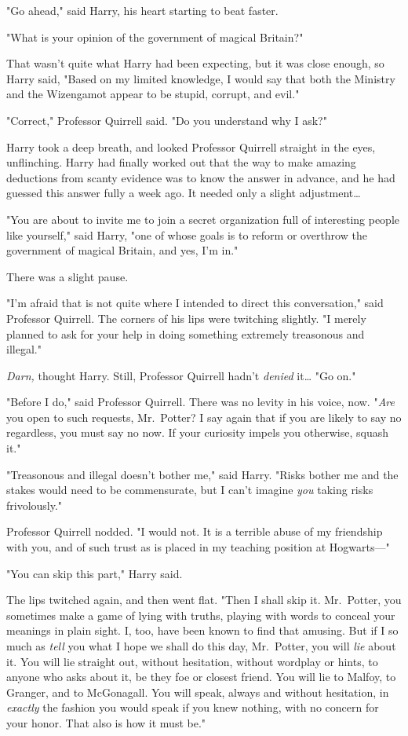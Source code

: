 "Go ahead," said Harry, his heart starting to beat faster.

"What is your opinion of the government of magical Britain?"

That wasn't quite what Harry had been expecting, but it was close enough, so 
Harry said, "Based on my limited knowledge, I would say that both the Ministry 
and the Wizengamot appear to be stupid, corrupt, and evil."

"Correct," Professor Quirrell said. "Do you understand why I ask?"

Harry took a deep breath, and looked Professor Quirrell straight in the eyes, 
unflinching. Harry had finally worked out that the way to make amazing 
deductions from scanty evidence was to know the answer in advance, and he had 
guessed this answer fully a week ago. It needed only a slight adjustment{\ldots}

"You are about to invite me to join a secret organization full of interesting 
people like yourself," said Harry, "one of whose goals is to reform or 
overthrow the government of magical Britain, and yes, I'm in."

There was a slight pause.

"I'm afraid that is not quite where I intended to direct this conversation," 
said Professor Quirrell. The corners of his lips were twitching slightly. "I 
merely planned to ask for your help in doing something extremely treasonous and 
illegal."

\emph{Darn,} thought Harry. Still, Professor Quirrell hadn't \emph{denied} 
it{\ldots} "Go on."

"Before I do," said Professor Quirrell. There was no levity in his voice, now. 
"\emph{Are} you open to such requests, Mr.~Potter? I say again that if you are 
likely to say no regardless, you must say no now. If your curiosity impels you 
otherwise, squash it."

"Treasonous and illegal doesn't bother me," said Harry. "Risks bother me and 
the stakes would need to be commensurate, but I can't imagine \emph{you} taking 
risks frivolously."

Professor Quirrell nodded. "I would not. It is a terrible abuse of my 
friendship with you, and of such trust as is placed in my teaching position at 
Hogwarts---"

"You can skip this part," Harry said.

The lips twitched again, and then went flat. "Then I shall skip it. Mr.~Potter, 
you sometimes make a game of lying with truths, playing with words to conceal 
your meanings in plain sight. I, too, have been known to find that amusing. But 
if I so much as \emph{tell} you what I hope we shall do this day, Mr.~Potter, 
you will \emph{lie} about it. You will lie straight out, without hesitation, 
without wordplay or hints, to anyone who asks about it, be they foe or closest 
friend. You will lie to Malfoy, to Granger, and to McGonagall. You will speak, 
always and without hesitation, in \emph{exactly} the fashion you would speak if 
you knew nothing, with no concern for your honor. That also is how it must be."

